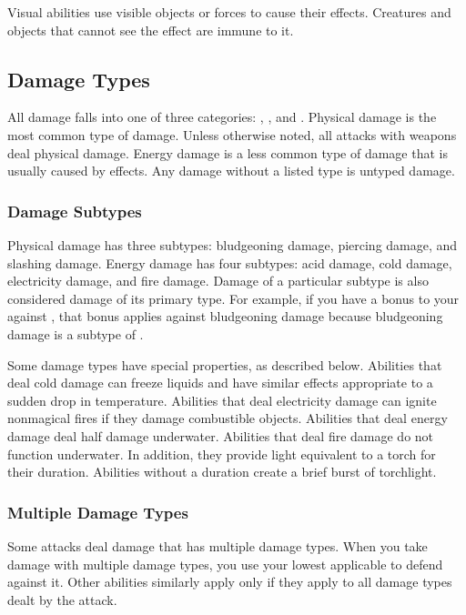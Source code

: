          Visual abilities use visible objects or forces to cause their effects.
        Creatures and objects that cannot see the effect are immune to it.

    \subsection{Damage Types}\label{Damage Types}
        All damage falls into one of three categories: , , and .
        Physical damage is the most common type of damage.
        Unless otherwise noted, all attacks with weapons deal physical damage.
        Energy damage is a less common type of damage that is usually caused by  effects.
        Any damage without a listed type is untyped damage.

        \subsubsection{Damage Subtypes}\label{Damage Subtypes}
            Physical damage has three subtypes: bludgeoning damage, piercing damage, and slashing damage.
            Energy damage has four subtypes: acid damage, cold damage, electricity damage, and fire damage.
            Damage of a particular subtype is also considered damage of its primary type.
            For example, if you have a bonus to your  against , that bonus applies against bludgeoning damage because bludgeoning damage is a subtype of .

            Some damage types have special properties, as described below.
             Abilities that deal cold damage can freeze liquids and have similar effects appropriate to a sudden drop in temperature.
             Abilities that deal electricity damage can ignite nonmagical fires if they damage combustible objects.
             Abilities that deal energy damage deal half damage underwater.
             Abilities that deal fire damage do not function underwater.
            In addition, they provide light equivalent to a torch for their duration.
            Abilities without a duration create a brief burst of torchlight.

        \subsubsection{Multiple Damage Types}\label{Multiple Damage Types}
            Some attacks deal damage that has multiple damage types.
            When you take damage with multiple damage types, you use your lowest applicable  to defend against it.
            Other abilities similarly apply only if they apply to all damage types dealt by the attack.

